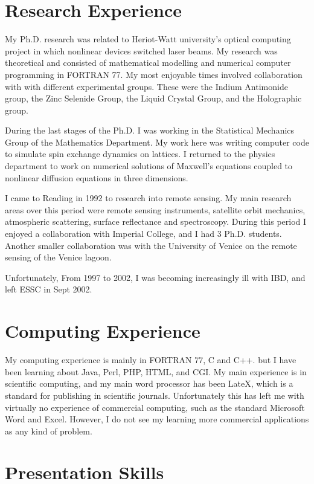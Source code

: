 \begin{flushleft}
\section{Research Experience}

My Ph.D. research was related to Heriot-Watt university's optical computing project
in which nonlinear devices switched laser beams. My research was theoretical and consisted of mathematical
modelling and numerical computer programming in FORTRAN 77.
My most enjoyable times involved collaboration with 
with different experimental groups.  These were the Indium Antimonide group, the Zinc Selenide Group,
 the Liquid Crystal Group, and the Holographic group. 

During the last stages of the Ph.D.  I was  working in the Statistical
Mechanics Group of the Mathematics Department. My work here was  writing computer
code to simulate spin exchange dynamics on lattices.
I returned to the physics
department to work on numerical solutions of Maxwell's equations
coupled to nonlinear diffusion equations in three dimensions. 

I came to Reading in 1992 to research into remote sensing. My main research areas over this
period were remote sensing instruments, satellite orbit mechanics, atmospheric scattering,
 surface reflectance and spectroscopy.
During this period I enjoyed a collaboration with Imperial College, and I had 3 Ph.D. students. 
Another smaller collaboration
was with  the University of Venice on the remote sensing of the Venice lagoon. 

Unfortunately, From 1997 to 2002, I was becoming increasingly ill with IBD, and
left ESSC in Sept 2002. 

\section{Computing Experience}

My computing experience is mainly in FORTRAN 77, C and C++. but I 
have been learning about  Java, Perl, PHP, HTML, and CGI. My main
experience is in scientific computing, and my main word processor has been 
LateX, which is a standard for publishing in scientific journals. Unfortunately
this has left me with virtually no experience of commercial computing, such as the standard 
Microsoft Word and Excel. However, I do not see my learning more commercial applications
as any kind of problem.

\section{Presentation Skills}


\end{flushleft}
